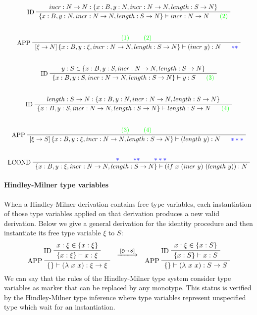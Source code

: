 \documentclass[a4paper]{report}
\newcommand{\gmarker}[1]{\textcolor{green}{~~~~~#1}}
\newcommand{\bmarker}[1]{\textcolor{blue}{~~~~~#1}}
\newcommand{\ax}[1]%
{\AxiomC{$#1$}}
\newcommand{\unc}[1]%
{\UnaryInfC{$#1$}}
\newcommand{\bic}[1]%
{\BinaryInfC{$#1$}}
\newcommand{\tric}[1]%
{\TrinaryInfC{$#1$}}
\newcommand{\drule}%
{\DisplayProof}
\begin{document}
\begin{itemize}
$$\begin{array}{c}
\ax{incr:N\to N:\{x:B, y:N, incr:N\to N, length:S\to N\}}
\LeftLabel{ID}
\unc{\{x:B, y:N, incr:N\to N, length:S\to N\}\vdash incr:N\to N\gmarker{(2)}}
\drule
\\\\\\
\ax{\textcolor{green}{(1)}}
\ax{\textcolor{green}{(2)}}
\LeftLabel{APP}
\bic{\left[\xi\to N\right]\{x:B, y:\xi, incr:N\to N, length:S\to N\}\vdash (incr\ y): N\bmarker{**}}
\drule
\\\\\\
\ax{y:S\in\{x:B, y:S, incr:N\to N, length:S\to N\}}
\LeftLabel{ID}
\unc{\{x:B, y:S, incr:N\to N, length:S\to N\}\vdash y:S\gmarker{(3)}}
\drule
\\\\\\
\ax{length:S\to N:\{x:B, y:N, incr:N\to N, length:S\to N\}}
\LeftLabel{ID}
\unc{\{x:B, y:S, incr:N\to N, length:S\to N\}\vdash length:S\to N\gmarker{(4)}}
\drule
\\\\\\
\ax{\textcolor{green}{(3)}}
\ax{\textcolor{green}{(4)}}
\LeftLabel{APP}
\bic{\left[\xi\to S\right]\{x:B, y:\xi, incr:N\to N, length:S\to N\}\vdash (length\ y): N\bmarker{***}}
\drule
\\\\\\
\ax{\textcolor{blue}{*}}
\ax{\textcolor{blue}{**}}
\ax{\textcolor{blue}{***}}
\LeftLabel{LCOND}
\tric{\{x:B, y:\xi, incr:N\to N, length:S\to N\}\vdash (if\ x\ (incr\ y)\ (length\ y)):N}
\drule
\end{array}$$
\end{itemize}

\paragraph{Hindley-Milner type variables} When a Hindley-Milner derivation contains free type variables, each instantiation of those type variables applied on that derivation produces a new valid derivation. Below we give a general derivation for the identity procedure and then instantiate its free type variable $\xi$ to $S$:
$$\begin{array}{ccc}
\ax{x:\xi\in\{x:\xi\}}
\LeftLabel{ID}
\unc{\{x:\xi\}\vdash x:\xi}
\LeftLabel{APP}
\unc{\{\}\vdash(\lambda\ x\ x):\xi\to\xi}
\drule
&
\xlongrightarrow{[\xi\mapsto S]}
&
\ax{x:\xi\in\{x: S\}}
\LeftLabel{ID}
\unc{\{x:S\}\vdash x:S}
\LeftLabel{APP}
\unc{\{\}\vdash(\lambda\ x\ x):S\to S}
\drule
\end{array}$$
We can say that the rules of the Hindley-Milner type system consider type variables as marker that can be replaced by any monotype. This status is verified by the Hindley-Milner type inference where type variables represent unspecified type which wait for an instantiation.
\end{document}
